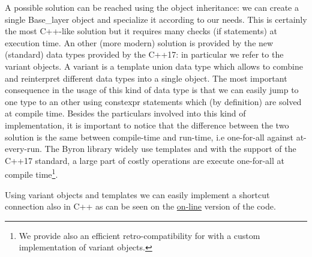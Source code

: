 \documentclass{standalone}
\begin{document}
A possible solution can be reached using the object inheritance: we can create a single \textsf{Base\_layer} object and specialize it according to our needs.
This is certainly the most \textsf{C++}-like solution but it requires many checks (if statements) at execution time.
An other (more modern) solution is provided by the new (standard) data types provided by the \textsf{C++17}: in particular we refer to the \textsf{variant} objects.
A \textsf{variant} is a \textsf{template union} data type which allows to combine and reinterpret different data types into a single object.
The most important consequence in the usage of this kind of data type is that we can easily jump to one type to an other using \textsf{constexpr} statements which (by definition) are solved at compile time.
Besides the particulars involved into this kind of implementation, it is important to notice that the difference between the two solution is the same between compile-time and run-time, i.e one-for-all against at-every-run.
The \textsf{Byron} library widely use \textsf{template}s and with the support of the \textsf{C++17} standard, a large part of costly operations are execute one-for-all at compile time\footnote{
  We provide also an efficient retro-compatibility for  with a custom implementation of \textsf{variant} objects.
}.

Using \textsf{variant} objects and \textsf{templates} we can easily implement a shortcut connection also in \textsf{C++} as can be seen on the \href{https://github.com/Nico-Curti/Byron/blob/master/src/shortcut_layer.cpp}{on-line} version of the code.
\end{document}
